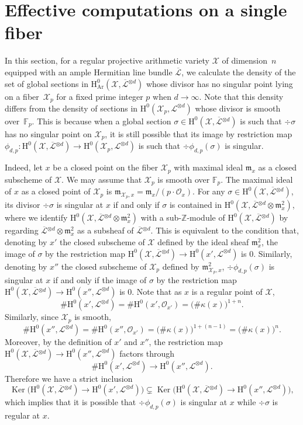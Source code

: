 \documentclass[JEP,XML,SOM,Unicode,published]{cedram}
\let\ra\rightarrow
\theoremstyle{plain}
\theoremstyle{definition}
\newcommand{\ho}{\mathrm{H}}
\newcommand{\X}{\mathcal{X}}
\newcommand{\Li}{\overline{\mathcal{L}}{}}
\newcommand{\li}{\mathcal{L}}
\newcommand{\Z}{\mathbb{Z}}
\newcommand{\F}{\mathbb{F}}
\DeclareMathOperator{\Ker}{Ker}
\begin{document}
\section{Effective computations on a single fiber}\label{effective}

In this section, for a regular projective arithmetic variety $\X$ of dimension~$n$ equipped with an ample Hermitian line bundle $\Li$, we calculate the density of the set of global sections in $\ho^0_{\mathrm{Ar}}(\X, \Li^{\otimes d})$ whose divisor has no singular point lying on a fiber~$\X_p$ for a fixed prime integer $p$ when $d\to \infty$. Note that this density differs from the density of sections in $\ho^0(\X_p, \li^{\otimes d})$ whose divisor is smooth over~$\F_p$. This is because when a global section $\sigma \in \ho^0(\X, \Li^{\otimes d})$ is such that $\div \sigma$ has no singular point on $\X_p$, it is still possible that its image by restriction map $\phi_{d,p}: \ho^0(\X, \Li^{\otimes d})\to \ho^0(\X_p, \li^{\otimes d})$ is such that $\div \phi_{d,p}(\sigma)$ is singular.

Indeed, let $x$ be a closed point on the fiber $\X_p$ with maximal ideal $\mathfrak{m}_x$ as a closed subscheme of $\X$. We may assume that $\X_p$ is smooth over $\F_p$. The maximal ideal of $x$ as a closed point of $\X_p$ is $\mathfrak{m}_{\X_p,x}=\mathfrak{m}_x/(p\cdot\mathcal{O}_x)$. For any $\sigma\in \ho^0(\X,\Li^{\otimes d})$, its divisor $\div \sigma$ is singular at $x$ if and only if $\sigma$ is contained in $\ho^0(\X, \Li^{\otimes d}\otimes \mathfrak{m}_{x}^2)$, where we identify $\ho^0(\X, \Li^{\otimes d}\otimes \mathfrak{m}_{x}^2)$ with a sub-$\Z$-module of $\ho^0(\X,\Li^{\otimes d})$ by regarding $\Li^{\otimes d}\otimes \mathfrak{m}_{x}^2$ as a subsheaf of $\Li^{\otimes d}$. This is equivalent to the condition that, denoting by $x'$ the closed subscheme of $\X$ defined by the ideal sheaf $\mathfrak{m}_x^2$, the image of $\sigma$ by the restriction map $\ho^0(\X, \Li^{\otimes d})\to \ho^0(x', \li^{\otimes d})$ is $0$. Similarly, denoting by $x''$ the closed subscheme of $\X_p$ defined by $\mathfrak{m}_{\X_p,x}^2$, $\div \phi_{d,p}(\sigma)$ is singular at $x$ if and only if the image of $\sigma$ by the restriction map $\ho^0(\X, \Li^{\otimes d})\to \ho^0(x'', \li^{\otimes d})$ is $0$. Note that as $x$ is a regular point of $\X$,
\[
\#\ho^0(x', \li^{\otimes d})=\#\ho^0(x', \mathcal{O}_{x'})=\big(\#\kappa(x)\big)^{1+n}.
\]
Similarly, since $\X_p$ is smooth,
\[
\#\ho^0(x'', \li^{\otimes d})=\#\ho^0(x'', \mathcal{O}_{x'})=\big(\#\kappa(x)\big)^{1+(n-1)}=\big(\#\kappa(x)\big)^n.
\]
Moreover, by the definition of $x'$ and $x''$, the restriction map $\ho^0(\X, \Li^{\otimes d})\to \ho^0(x'', \li^{\otimes d})$ factors through
\[
\#\ho^0(x', \li^{\otimes d})\to \ho^0(x'', \li^{\otimes d}).
\]
Therefore we have a strict inclusion
\[
\Ker\bigl(\ho^0(\X, \Li^{\otimes d})\ra \ho^0(x', \li^{\otimes d}) \bigr) \subsetneq \Ker\bigl(\ho^0(\X, \Li^{\otimes d})\ra \ho^0(x'', \li^{\otimes d})\bigr),
\]
which implies that it is possible that $\div \phi_{d,p}(\sigma)$ is singular at $x$ while $\div \sigma$ is regular at $x$.
\end{document}
